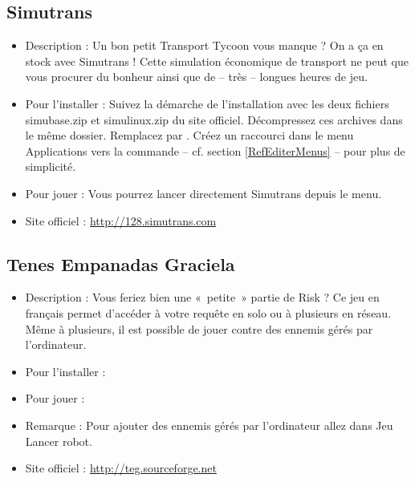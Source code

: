 \subsection{Simutrans}
\begin{itemize}
\begingroup
{}
\item Description : Un bon petit Transport Tycoon vous manque ? On a ça en stock avec Simutrans ! Cette simulation économique de transport ne peut que vous procurer du bonheur ainsi que de -- très -- longues heures de jeu.{\par}
\endgroup
\item Pour l'installer : Suivez la démarche de l'installation avec les deux fichiers simubase.zip et simulinux.zip du  site officiel. Décompressez ces archives dans le même dossier. Remplacez  par . Créez un raccourci dans le menu Applications vers la commande  -- cf. section \ref{RefEditerMenus} -- pour plus de simplicité.{\par}
\item Pour jouer : Vous pourrez lancer directement Simutrans depuis le menu.{\par}
\item Site officiel : \url{http://128.simutrans.com}{\par}
\end{itemize}
\subsection{Tenes Empanadas Graciela}
\begin{itemize}
\begingroup
{}
\item Description : Vous feriez bien une «~petite~» partie de Risk ? Ce jeu en français permet d'accéder à votre requête en solo ou à plusieurs en réseau. Même à plusieurs, il est possible de jouer contre des ennemis gérés par l'ordinateur.{\par}
\endgroup
\item Pour l'installer : 
\item Pour jouer : 
\item Remarque : Pour ajouter des ennemis gérés par l'ordinateur allez dans Jeu \FlecheDroite Lancer robot.{\par}
\item Site officiel : \url{http://teg.sourceforge.net}{\par}
\end{itemize}
